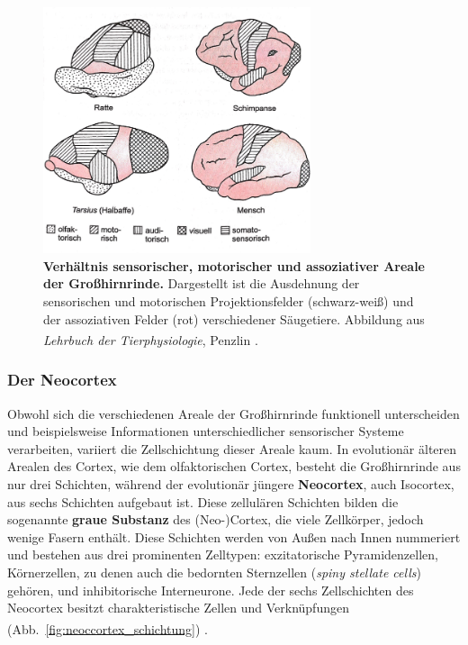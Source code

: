\documentclass[12pt,a4paper,pdftex]{article}
\begin{document}
\begin{figure}[H]
    \centering
    \includegraphics[width=0.7\textwidth]{pictures/Bilder_Jule/Andere/grosshirnrinde_vgl.png}
    \caption[Verhältnis sensorischer, motorischer und assoziativer Areale der Großhirnrinde]{\textbf{Verhältnis sensorischer, motorischer und assoziativer Areale der Großhirnrinde.} Dargestellt ist die Ausdehnung der sensorischen und motorischen Projektionsfelder (schwarz-weiß) und der assoziativen Felder (rot) verschiedener Säugetiere. Abbildung aus \textit{Lehrbuch der Tierphysiologie}, Penzlin \textsuperscript{\cite[14]{penzlin2005tierphys}}.}
    \label{fig:grosshinrinde_vgl}
\end{figure}{}

\subsubsection*{Der Neocortex} 

Obwohl sich die verschiedenen Areale der Großhirnrinde funktionell unterscheiden und beispielsweise Informationen unterschiedlicher sensorischer Systeme verarbeiten, variiert die Zellschichtung dieser Areale kaum. In evolutionär älteren Arealen des Cortex, wie dem olfaktorischen Cortex, besteht die Großhirnrinde aus nur drei Schichten, während der evolutionär jüngere \textbf{Neocortex}, auch Isocortex, aus sechs Schichten aufgebaut ist. Diese zellulären Schichten bilden die sogenannte \textbf{graue Substanz} des (Neo-)Cortex, die viele Zellkörper, jedoch wenige Fasern enthält. Diese Schichten werden von Außen nach Innen nummeriert und bestehen aus drei prominenten Zelltypen: exzitatorische Pyramidenzellen, Körnerzellen, zu denen auch die bedornten Sternzellen (\textit{spiny stellate cells}) gehören, und inhibitorische Interneurone. Jede der sechs Zellschichten des Neocortex besitzt charakteristische Zellen und  Verknüpfungen (Abb.~\ref{fig:neoccortex_schichtung}) \textsuperscript{\cite[7]{watson2010thebrain}}. 
\end{document}

